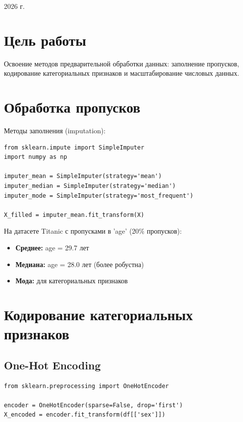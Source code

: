 \documentclass[a4paper,12pt]{article}
\begin{document}
\vfill

\begin{center}
    \large 2026 г.
\end{center}

\newpage

\pagestyle{plain}

\section*{Цель работы}
Освоение методов предварительной обработки данных: заполнение пропусков, кодирование категориальных признаков и масштабирование числовых данных.

\section*{Обработка пропусков}

Методы заполнения (imputation):
\begin{lstlisting}
from sklearn.impute import SimpleImputer
import numpy as np

imputer_mean = SimpleImputer(strategy='mean')
imputer_median = SimpleImputer(strategy='median')
imputer_mode = SimpleImputer(strategy='most_frequent')

X_filled = imputer_mean.fit_transform(X)
\end{lstlisting}

На датасете Titanic с пропусками в 'age' (20\% пропусков):
\begin{itemize}
    \item \textbf{Среднее:} age = 29.7 лет
    \item \textbf{Медиана:} age = 28.0 лет (более робустна)
    \item \textbf{Мода:} для категориальных признаков
\end{itemize}

\section*{Кодирование категориальных признаков}

\subsection*{One-Hot Encoding}
\begin{lstlisting}
from sklearn.preprocessing import OneHotEncoder

encoder = OneHotEncoder(sparse=False, drop='first')
X_encoded = encoder.fit_transform(df[['sex']])
\end{lstlisting}
\end{document}
